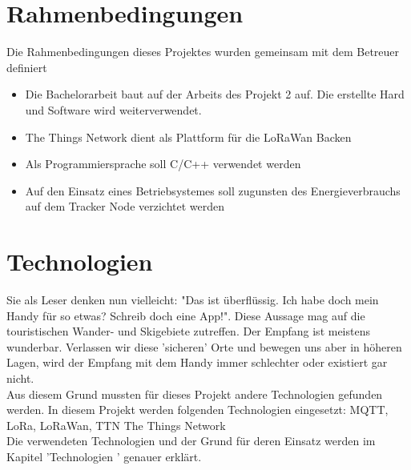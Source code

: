 \documentclass[11pt,english,german]{report}
\theoremstyle{definition}
\begin{document}
\section{Rahmenbedingungen}
Die Rahmenbedingungen dieses Projektes wurden gemeinsam mit dem Betreuer definiert
\begin{itemize}
\item Die Bachelorarbeit baut auf der Arbeits des Projekt 2 auf. Die erstellte Hard und Software wird weiterverwendet.
\item The Things Network dient als Plattform für die LoRaWan Backen
\item Als Programmiersprache soll C/C++ verwendet werden
\item Auf den Einsatz eines Betriebsystemes soll zugunsten des Energieverbrauchs auf dem Tracker Node verzichtet werden
\end{itemize}

\section{Technologien}
Sie als Leser denken nun vielleicht: "Das ist überflüssig. Ich habe doch mein Handy für so etwas? Schreib doch eine App!". Diese Aussage mag auf die touristischen Wander- und Skigebiete zutreffen. Der Empfang ist meistens wunderbar. Verlassen wir diese 'sicheren' Orte und bewegen uns aber in höheren Lagen, wird der Empfang mit dem Handy immer schlechter oder existiert gar nicht. \bigskip \\
Aus diesem Grund mussten für dieses Projekt andere Technologien gefunden werden. In diesem Projekt werden folgenden Technologien eingesetzt:
\gls{MQTT}, \gls{LoRa}, \gls{LoRaWan}, \gls{TTN} The Things Network\bigskip \\
Die verwendeten Technologien und der Grund für deren Einsatz werden im Kapitel 'Technologien ' genauer erklärt.
\end{document}
